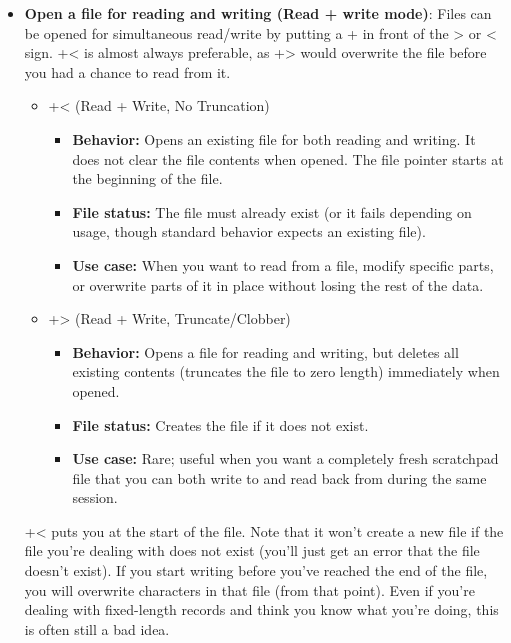 \documentclass{report}
\begin{document}
\begin{itemize}
            \bigbreak \noindent 
            The File::Temp module can also be used to create in-memory temporary files if required.
        \item \textbf{Open a file for reading and writing (Read + write mode)}: Files can be opened for simultaneous read/write by putting a + in front of the > or < sign. +< is almost always preferable, as +> would overwrite the file before you had a chance to read from it.
            \begin{itemize}
                \item +< (Read + Write, No Truncation)
                    \begin{itemize}
                        \item \textbf{Behavior:} Opens an existing file for both reading and writing. It does not clear the file contents when opened. The file pointer starts at the beginning of the file.
                        \item \textbf{File status:} The file must already exist (or it fails depending on usage, though standard behavior expects an existing file).
                        \item \textbf{Use case:} When you want to read from a file, modify specific parts, or overwrite parts of it in place without losing the rest of the data.
                    \end{itemize}
                \item +> (Read + Write, Truncate/Clobber)
                    \begin{itemize}
                        \item \textbf{Behavior:} Opens a file for reading and writing, but deletes all existing contents (truncates the file to zero length) immediately when opened.
                        \item \textbf{File status:} Creates the file if it does not exist.
                        \item \textbf{Use case:} Rare; useful when you want a completely fresh scratchpad file that you can both write to and read back from during the same session.
                    \end{itemize}
            \end{itemize}
            +< puts you at the start of the file. Note that it won’t create a new file if the file you’re dealing with does not exist (you’ll just get an error that the file doesn’t exist). If you start writing before you’ve reached the end of the file, you will overwrite characters in that file (from that point). Even if you’re dealing with fixed-length records and think you know what you’re doing, this is often still a bad idea.

\end{itemize}
\end{document}
